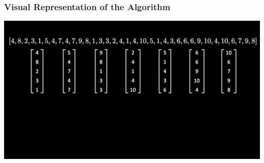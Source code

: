 \begin{frame}
    \frametitle{Visual Representation of the Algorithm}
    \begin{center}
        \href{https://drive.google.com/file/d/1SaXqVaz6IKVs5eATkncYFpq6uDMj4Q3e/view?usp=drive_link}{\includegraphics[width=\linewidth]{figures/general/a.png}}
    \end{center}
\end{frame}

